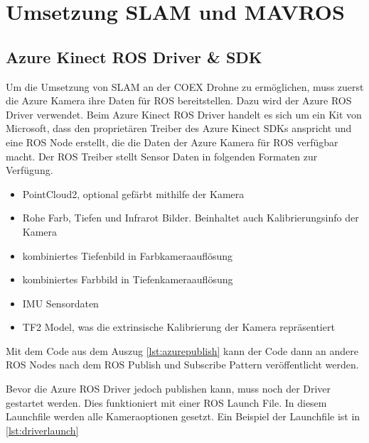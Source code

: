 \section{Umsetzung SLAM und MAVROS} \label{slam:section}
\subsection{Azure Kinect ROS Driver \& SDK}

Um die Umsetzung von \ac{SLAM} an der COEX Drohne zu ermöglichen, muss zuerst die Azure Kamera ihre Daten für ROS bereitstellen. Dazu wird der Azure ROS Driver verwendet. Beim Azure Kinect ROS Driver handelt es sich um ein Kit von Microsoft, dass den proprietären Treiber des Azure Kinect SDKs anspricht und eine ROS Node erstellt, die die Daten der Azure Kamera für ROS verfügbar macht. Der ROS Treiber stellt Sensor Daten in folgenden Formaten zur Verfügung.

\begin{itemize}
    \item PointCloud2, optional gefärbt mithilfe der Kamera
    \item Rohe Farb, Tiefen und Infrarot Bilder. Beinhaltet auch Kalibrierungsinfo der Kamera
    \item kombiniertes Tiefenbild in Farbkameraauflösung
    \item kombiniertes Farbbild in Tiefenkameraauflösung
    \item \ac{IMU} Sensordaten
    \item \ac{TF}2 Model, was die extrinsische Kalibrierung der Kamera repräsentiert
\end{itemize}

Mit dem Code aus dem Auszug \ref{lst:azurepublish} kann der Code dann an andere \ac{ROS} Nodes nach dem \ac{ROS} Publish und Subscribe Pattern veröffentlicht werden.

Bevor die Azure ROS Driver jedoch publishen kann, muss noch der Driver gestartet werden. Dies funktioniert mit einer \ac{ROS} Launch File. In diesem Launchfile werden alle Kameraoptionen gesetzt. Ein Beispiel der Launchfile ist in \ref{lst:driverlaunch}
\cite[vgl. ]{kinect_ros_driver}

